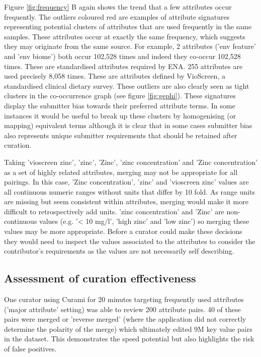\documentclass{bmcart}
\begin{document}
Figure \ref{fig:frequency} B again shows the trend that a few attributes occur frequently. The outliers coloured red are examples of attribute signatures representing potential clusters of attributes that are used frequently in the same samples. These attributes occur at exactly the same frequency, which suggests they may originate from the same source. For example, 2 attributes ('env feature' and 'env biome') both occur 102,528 times and indeed they co-occur 102,528 times. These are standardised attributes required by ENA. 255 attributes are used precisely 8,058 times. These are attributes defined by VioScreen, a standardised clinical dietary survey. These outliers are also clearly seen as tight clusters in the co-occurrence graph (see figure \ref{fig:gephi}). These signatures display the submitter bias towards their preferred attribute terms. In some instances it would be useful to break up these clusters by homogenising (or mapping) equivalent terms although it is clear that in some cases submitter bias also represents unique submitter requirements that should be retained after curation. 

Taking 'vioscreen zinc', 'zinc', 'Zinc', 'zinc concentration' and 'Zinc concentration' as a set of highly related attributes, merging may not be appropriate for all pairings. In this case, 'Zinc concentration', 'zinc' and 'vioscreen zinc' values are all continuous numeric ranges without units that differ by 10 fold. As range units are missing but seem consistent within attributes, merging would make it more difficult to retrospectively add units. 'zinc concentration' and 'Zinc' are non-continuous values (e.g. '< 10 mg/l', 'high zinc' and 'low zinc') so merging these values may be more appropriate. Before a curator could make these decisions they would need to inspect the values associated to the attributes to consider the contributor's requirements as the values are not necessarily self describing.

\subsection*{Assessment of curation effectiveness}

One curator using Curami for 20 minutes targeting frequently used attributes ('major attribute' setting) was able to review 200 attribute pairs. 40 of these pairs were merged or 'reverse merged' (where the application did not correctly determine the polarity of the merge) which ultimately edited 9M key value pairs in the dataset. This demonstrates the speed potential but also highlights the risk of false positives.
\end{document}
